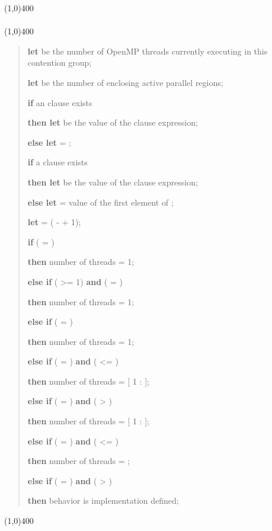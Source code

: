 \begin{samepage}
\nolinenumbers\line(1,0){400}\\[.4\baselineskip]
\\[-0.5\baselineskip]
\line(1,0){400}\linenumbers

\begin{quote}
\textbf{let}  be the number of OpenMP threads currently executing in
this contention group;

\textbf{let}  be the number of enclosing active parallel regions;

\textbf{if} an  clause exists

\textbf{then let}  be the value of the  clause expression;

\textbf{else let}  = ;

\textbf{if} a  clause exists

\textbf{then let}  be the value of the  clause
expression;

\textbf{else let}  = value of the first element of ;

\textbf{let}  = ( -  + 1);

\textbf{if} ( = )

\textbf{then} number of threads = 1;

\textbf{else if} ( >= 1) \textbf{and} ( = )

\textbf{then} number of threads = 1;

\textbf{else if} ( = )

\textbf{then} number of threads = 1;

\textbf{else if} ( = ) \textbf{and} ( <= )

\textbf{then} number of threads = [ 1 :  ];

\textbf{else if} ( = ) \textbf{and} ( > )

\textbf{then} number of threads = [ 1 :  ];

\textbf{else if} ( = ) \textbf{and} ( <= )

\textbf{then} number of threads = ;

\textbf{else if} ( = ) \textbf{and} ( > )

\textbf{then} behavior is implementation defined;
\end{quote}

\nolinenumbers\line(1,0){400}\linenumbers
\end{samepage}
\bigskip

